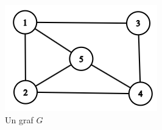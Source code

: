 \documentclass{article}
\begin{document}
\begin{figure}[h]
    \centering
    \begin{minipage}{0.45\textwidth}
        \centering
        \includegraphics[width=\textwidth]{images/graph_cropped.png}
        \caption{Un graf $G$}
        \label{fig:graf}
    \end{minipage}\hfill
    \begin{minipage}{0.45\textwidth}
        \centering

\end{minipage}
\end{figure}
\end{document}
